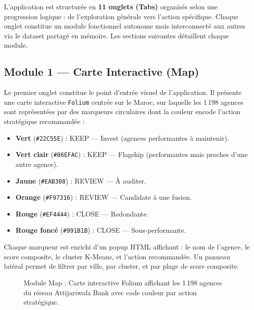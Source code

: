 L'application est structurée en \textbf{11 onglets (Tabs)} organisés selon une progression logique : de l'exploration générale vers l'action spécifique. Chaque onglet constitue un module fonctionnel autonome mais interconnecté aux autres via le dataset partagé en mémoire. Les sections suivantes détaillent chaque module.

\subsection{Module 1 — Carte Interactive (Map)}

Le premier onglet constitue le point d'entrée visuel de l'application. Il présente une carte interactive \texttt{Folium} centrée sur le Maroc, sur laquelle les 1\,198 agences sont représentées par des marqueurs circulaires dont la couleur encode l'action stratégique recommandée :

\begin{itemize}
    \item \textbf{Vert} (\texttt{\#22C55E}) : KEEP — Invest (agences performantes à maintenir).
    \item \textbf{Vert clair} (\texttt{\#86EFAC}) : KEEP — Flagship (performantes mais proches d'une autre agence).
    \item \textbf{Jaune} (\texttt{\#EAB308}) : REVIEW — À auditer.
    \item \textbf{Orange} (\texttt{\#F97316}) : REVIEW — Candidate à une fusion.
    \item \textbf{Rouge} (\texttt{\#EF4444}) : CLOSE — Redondante.
    \item \textbf{Rouge foncé} (\texttt{\#991B1B}) : CLOSE — Sous-performante.
\end{itemize}

Chaque marqueur est enrichi d'un popup HTML affichant : le nom de l'agence, le score composite, le cluster K-Means, et l'action recommandée. Un panneau latéral permet de filtrer par ville, par cluster, et par plage de score composite.

\begin{figure}[h]
    \centering
    \caption{Module Map : Carte interactive Folium affichant les 1\,198 agences du réseau Attijariwafa Bank avec code couleur par action stratégique.}
    \label{fig:screenshot_map}
\end{figure}

